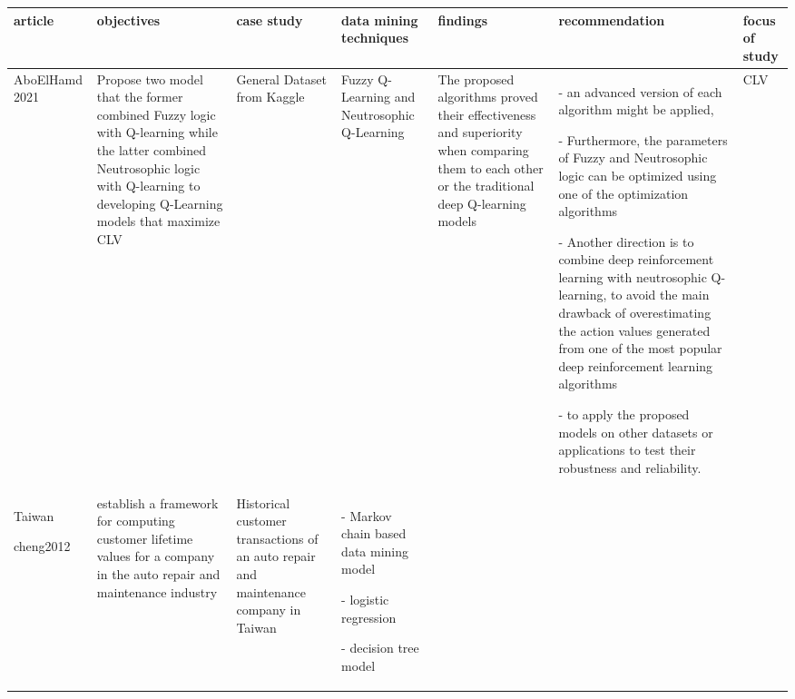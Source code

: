 \documentclass{article}
\begin{document}
\null

\recalctypearea

\begin{landscape}



  \begin{center}
    \begin{longtable} [t]  {|p{2cm}|p{4cm}|p{3cm}|p{3cm}|p{4cm}|p{8cm}|p{1cm}|}
 \hline
 \textbf{article} &\textbf{objectives}&\textbf{case study}&\textbf{data mining techniques}&\textbf{findings}&\textbf{recommendation}&\textbf{focus of study} \\ [0.5ex] 
 \hline
AboElHamd 2021
&Propose two model that the former combined Fuzzy logic with Q-learning while the latter combined Neutrosophic logic with Q-learning to developing Q-Learning models that maximize CLV&General Dataset from Kaggle&Fuzzy Q-Learning and
Neutrosophic Q-Learning
&The proposed algorithms proved their effectiveness and superiority when comparing them to each other or the traditional deep Q-learning models&- an advanced version of each algorithm might be applied,

- Furthermore, the parameters of Fuzzy and Neutrosophic logic can be optimized using one of the optimization algorithms

- Another direction is to combine deep reinforcement learning with neutrosophic Q-learning, to avoid the main drawback of overestimating the action values generated from one of the most popular deep reinforcement learning algorithms

- to apply the proposed models on other datasets or applications to test their robustness and reliability.
&CLV\\ [14mm]
 \hline
 Taiwan

cheng2012
&establish a framework for computing customer lifetime values for a company in the auto repair and maintenance industry&Historical customer transactions of an auto repair and maintenance company in Taiwan&- Markov chain based data
mining model

- logistic regression

- decision tree model


\end{longtable}
\end{center}
\end{landscape}
\end{document}
